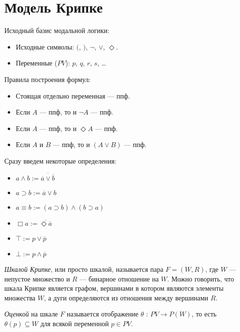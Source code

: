 \section{Модель Крипке}

Исходный базис модальной логики:
\begin{itemize}
    \item Исходные символы: $($, $)$, $\lnot$, $\lor$, $\Diamond$.
    \item Переменные ($PV$): $p$, $q$, $r$, $s$, \dots
\end{itemize}

Правила построения формул:

\begin{itemize}
    \item Стоящая отдельно переменная --- ппф.
    \item Если $A$ --- ппф, то и $\lnot A $ --- ппф.
    \item Если $A$ --- ппф, то и $\Diamond A $ --- ппф.
    \item Если $A$ и $B$ --- ппф, то и $( A \lor B )$ --- ппф.
\end{itemize}

Сразу введем некоторые определения:

\begin{itemize}
    \item $ a \land b := \overline{\overline{a} \lor \overline{b}} $
    \item $ a \supset b := \overline{a} \lor b $
    \item $ a \equiv b := (a \supset b) \land (b \supset a) $
    \item $ \Box a := \overline{\Diamond \overline{a}}$
    \item $ \top := p \lor \overline{p}$
    \item $ \bot := p \land \overline{p}$
\end{itemize}

\begin{definition}
    \textit{Шкалой Крипке}, или просто шкалой, называется пара $F = (W,R)$,
    где $W$ --- непустое множество и $R$ --- бинарное отношение на $W$.
    Можно говорить, что шкала Крипке является графом, вершинами в котором являются элементы множества $W$, а дуги определяются из отношения между вершинами $R$.
\end{definition}

\begin{definition}
    \textit{Оценкой} на шкале $F$ называется отображение $\theta$ : $PV \to  P(W)$,
    то есть $\theta(p) \subseteq W$ для всякой переменной $p \in PV$.
\end{definition}

